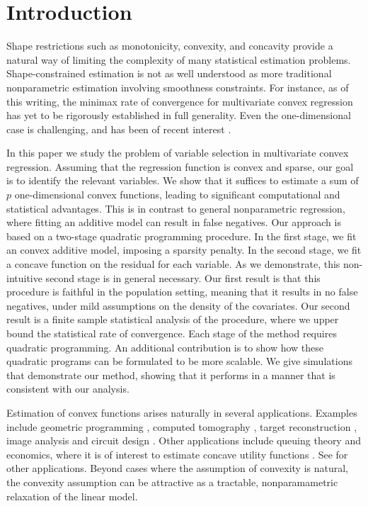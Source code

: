 \section{Introduction}


Shape restrictions such as monotonicity, convexity, and concavity
provide a natural way of limiting the complexity of many statistical
estimation problems.  Shape-constrained estimation is not as well
understood as more traditional nonparametric estimation involving
smoothness constraints.  For instance, as of this writing, the minimax
rate of convergence for multivariate convex regression has yet to be
rigorously established in full generality.  Even the one-dimensional
case is challenging, and has been of recent interest
\citep{guntusen:13}.

In this paper we study the problem of variable selection in
multivariate convex regression.  Assuming that the regression function is convex and
sparse, our goal is to identify the relevant variables.  We show that
it suffices to estimate a sum of $p$ one-dimensional convex functions,
leading to significant computational and statistical advantages.  This
is in contrast to general nonparametric regression, where fitting an
additive model can result in false negatives.  Our approach is based
on a two-stage quadratic programming procedure.  In the first stage,
we fit an convex additive model, imposing a sparsity penalty.  In the
second stage, we fit a concave function on the residual for each
variable.  As we demonstrate, this non-intuitive second stage is
in general necessary.  Our first result is that this procedure is
faithful in the population setting, meaning that it results in no
false negatives, under mild assumptions on the density of the
covariates.  Our second result is a finite sample statistical analysis
of the procedure, where we upper bound the statistical rate of
convergence.  Each stage of the method requires quadratic programming.
An additional contribution is to show how these quadratic programs can
be formulated to be more scalable.  We give simulations that
demonstrate our method, showing that it performs in a manner that is consistent with our analysis.

Estimation of convex functions arises naturally in several
applications.  Examples include geometric programming \citep{Boyd04},
computed tomography \citep{Prince:90}, target reconstruction
\citep{Lele:92}, image analysis \citep{Golden:06} and circuit design
\citep{Hannah:12}.  Other applications include queuing theory
\citep{Chen:01} and economics, where it is of interest to estimate
concave utility functions \citep{Pratt:68}.  See \cite{Lim:12} for
other applications.  
Beyond cases where the assumption of convexity is
natural, the convexity assumption can be attractive as a
tractable, nonparamametric relaxation of the linear model.  

